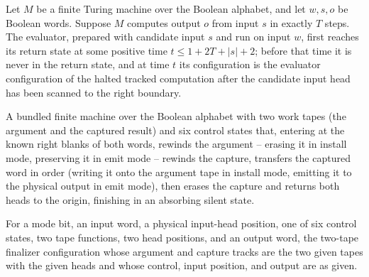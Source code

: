 \begin{lemma}
\label{Turing.FinTM.emCall_prepared_eval_first}
\leanok
{}
Let $M$ be a finite Turing machine over the Boolean alphabet, and let $w,s,o$ be Boolean
words. Suppose $M$ computes output $o$ from input $s$ in exactly $T$ steps. The
evaluator, prepared with candidate input $s$ and run on input $w$, first reaches its
return state at some positive time $t\le 1+2T+|s|+2$; before that time it is never in
the return state, and at time $t$ its configuration is the evaluator configuration of
the halted tracked computation after the candidate input head has been scanned to the
right boundary.
\end{lemma}

\begin{definition}
\label{Turing.FinTM.emCallFinishTM}
\leanok
{}
A bundled finite machine over the Boolean alphabet with two work tapes (the argument and
the captured result) and six control states that, entering at the known right blanks of
both words, rewinds the argument -- erasing it in install mode, preserving it in emit
mode -- rewinds the capture, transfers the captured word in order (writing it onto the
argument tape in install mode, emitting it to the physical output in emit mode), then
erases the capture and returns both heads to the origin, finishing in an absorbing
silent state.
\end{definition}

\begin{definition}
\label{Turing.FinTM.emCallFinishCfg}
\leanok
{}
For a mode bit, an input word, a physical input-head position, one of six control
states, two tape functions, two head positions, and an output word, the two-tape
finalizer configuration whose argument and capture tracks are the two given tapes with
the given heads and whose control, input position, and output are as given.
\end{definition}


